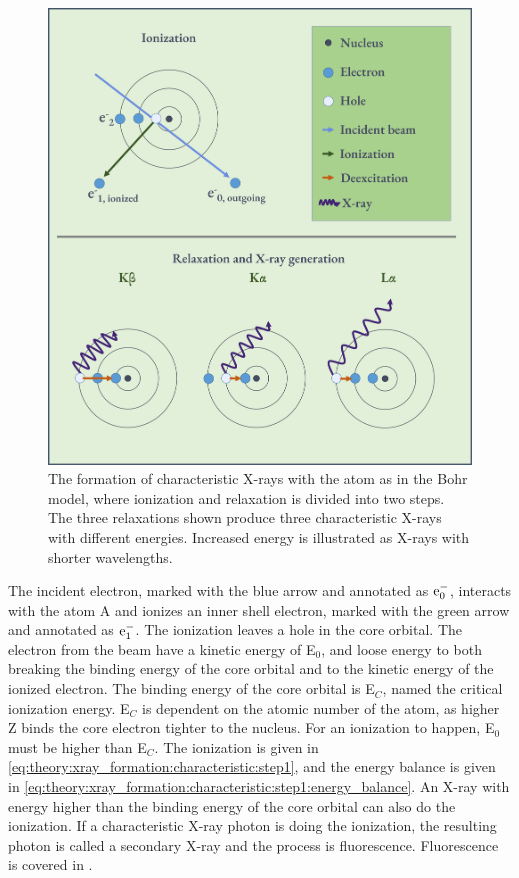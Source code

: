 \begin{figure}[ht]
    \centering
    \includegraphics[width=0.7\linewidth]{figures/characteristic_xray_formation.png}
    \caption{
        The formation of characteristic X-rays with the atom as in the Bohr model, where ionization and relaxation is divided into two steps.
        The three relaxations shown produce three characteristic X-rays with different energies.
        Increased energy is illustrated as X-rays with shorter wavelengths.
    }
    \label{fig:characteristic_xray_formation}
\end{figure}


The incident electron, marked with the blue arrow and annotated as $\textnormal{e}^-_{0}$, interacts with the atom A and ionizes an inner shell electron, marked with the green arrow and annotated as $\textnormal{e}^-_{1}$.
The ionization leaves a hole in the core orbital.
The electron from the beam have a kinetic energy of E$_{0}$, and loose energy to both breaking the binding energy of the core orbital and to the kinetic energy of the ionized electron.
The binding energy of the core orbital is E$_C$, named the critical ionization energy.
E$_C$ is dependent on the atomic number of the atom, as higher Z binds the core electron tighter to the nucleus.
For an ionization to happen, E$_0$ must be higher than E$_C$.
The ionization is given in \cref{eq:theory:xray_formation:characteristic:step1}, and the energy balance is given in \cref{eq:theory:xray_formation:characteristic:step1:energy_balance}.
An X-ray with energy higher than the binding energy of the core orbital can also do the ionization.
If a characteristic X-ray photon is doing the ionization, the resulting photon is called a secondary X-ray and the process is fluorescence.
Fluorescence is covered in .

